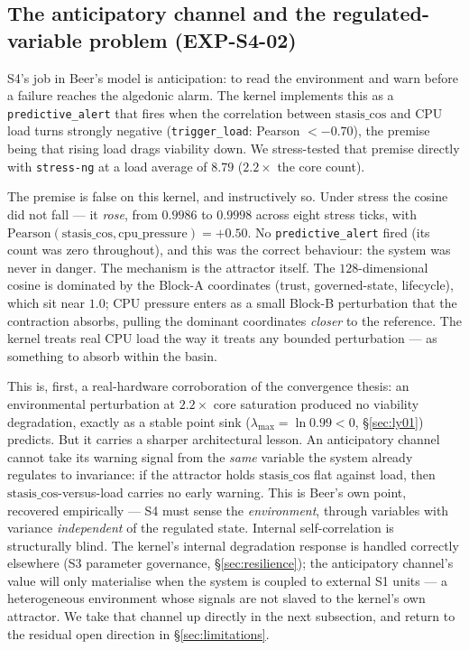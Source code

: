 \documentclass[11pt, a4paper]{article}
\begin{document}
\subsection{The anticipatory channel and the regulated-variable problem (EXP-S4-02)}
\label{sec:s4anticip}

S4's job in Beer's model is anticipation: to read the environment and warn before a
failure reaches the algedonic alarm. The kernel implements this as a
\texttt{predictive\_alert} that fires when the correlation between $\text{stasis\_cos}$
and CPU load turns strongly negative (\texttt{trigger\_load}: Pearson $< -0.70$), the
premise being that rising load drags viability down. We stress-tested that premise
directly with \texttt{stress-ng} at a load average of $8.79$ ($2.2\times$ the core
count).

The premise is false on this kernel, and instructively so. Under stress the cosine
did not fall --- it \emph{rose}, from $0.9986$ to $0.9998$ across eight stress ticks,
with $\text{Pearson}(\text{stasis\_cos}, \text{cpu\_pressure}) = +0.50$. No
\texttt{predictive\_alert} fired (its count was zero throughout), and this was the
correct behaviour: the system was never in danger. The mechanism is the attractor
itself. The $128$-dimensional cosine is dominated by the Block-A coordinates
(trust, governed-state, lifecycle), which sit near $1.0$; CPU pressure enters as a
small Block-B perturbation that the contraction absorbs, pulling the dominant
coordinates \emph{closer} to the reference. The kernel treats real CPU load the way
it treats any bounded perturbation --- as something to absorb within the basin.

This is, first, a real-hardware corroboration of the convergence thesis: an
environmental perturbation at $2.2\times$ core saturation produced no viability
degradation, exactly as a stable point sink ($\lambda_\text{max} = \ln 0.99 < 0$,
\S\ref{sec:ly01}) predicts. But it carries a sharper architectural lesson. An
anticipatory channel cannot take its warning signal from the \emph{same} variable the
system already regulates to invariance: if the attractor holds $\text{stasis\_cos}$
flat against load, then $\text{stasis\_cos}$-versus-load carries no early warning. This
is Beer's own point, recovered empirically --- S4 must sense the \emph{environment},
through variables with variance \emph{independent} of the regulated state. Internal
self-correlation is structurally blind. The kernel's internal degradation response is
handled correctly elsewhere (S3 parameter governance, \S\ref{sec:resilience}); the
anticipatory channel's value will only materialise when the system is coupled to
external S1 units --- a heterogeneous environment whose signals are not slaved to the
kernel's own attractor. We take that channel up directly in the next subsection, and
return to the residual open direction in \S\ref{sec:limitations}.
\end{document}
